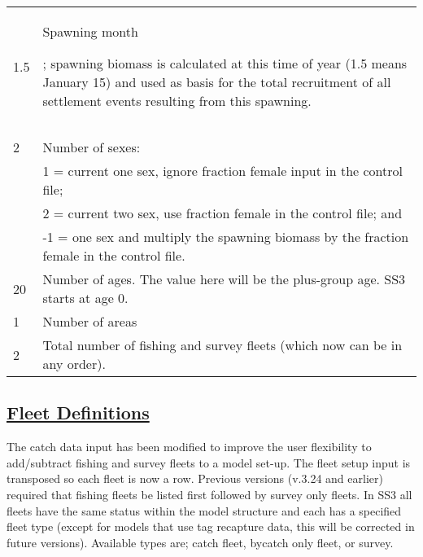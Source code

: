 \begin{center}
\begin{longtable}{p{3cm} p{12cm}}
		\hline
		1.5}} & \multirow{1}{1cm}[-0.1cm]{\parbox{12cm}{\hypertarget{RecrTiminig}{Spawning month}; spawning biomass is calculated at this time of year (1.5 means January 15) and used as basis for the total recruitment of all settlement events resulting from this spawning.}} \Tstrut\\
		& \\
		& \Bstrut\\

		\hline
		2 \Tstrut & Number of sexes: \\
		 & 1 = current one sex, ignore fraction female input in the control file;\\
		 & 2 = current two sex, use fraction female in the control file; and \\
		 & -1 = one sex and multiply the spawning biomass by the fraction female in the control file. \Bstrut\\

		\hline
		20 \Tstrut & Number of ages. The value here will be the plus-group age. SS3 starts at age 0. \\

		\hline
		1 & Number of areas \Tstrut\Bstrut\\

		\hline
		2 \Tstrut & Total number of fishing and survey fleets (which now can be in any order).\\
		\hline
	\end{longtable}
	\vspace*{-1.7\baselineskip}
\end{center}

\hypertarget{FleetDefinitions}{}
\subsection[Fleet Definitions]{\protect\hyperlink{FleetDefinitions}{Fleet Definitions}}
\hypertarget{GenericFleets}{}
The catch data input has been modified to improve the user flexibility to add/subtract fishing and survey fleets to a model set-up. The fleet setup input is transposed so each fleet is now a row. Previous versions (v.3.24 and earlier) required that fishing fleets be listed first followed by survey only fleets. In SS3 all fleets have the same status within the model structure and each has a specified fleet type (except for models that use tag recapture data, this will be corrected in future versions). Available types are; catch fleet, bycatch only fleet, or survey.   

